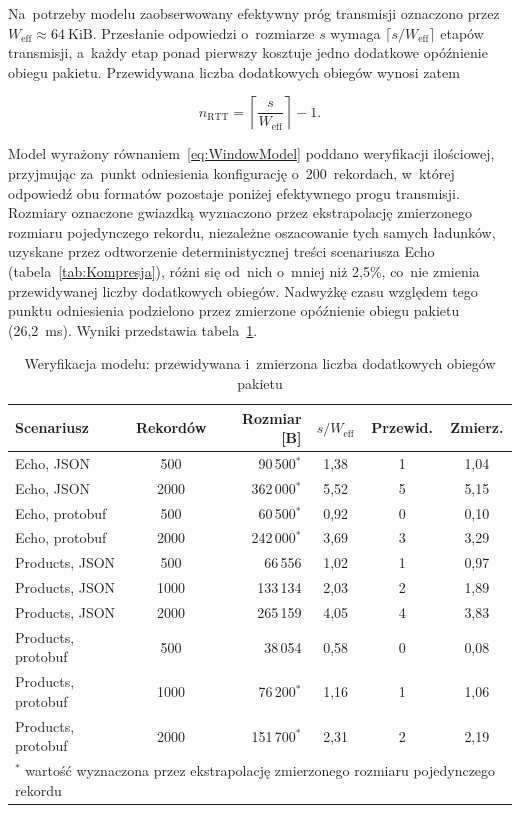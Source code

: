 Na~potrzeby modelu zaobserwowany efektywny próg transmisji oznaczono przez $W_{\mathrm{eff}} \approx 64~\mathrm{KiB}$. Przesłanie odpowiedzi o~rozmiarze $s$ wymaga $\lceil s / W_{\mathrm{eff}} \rceil$ etapów transmisji, a~każdy etap ponad pierwszy kosztuje jedno dodatkowe opóźnienie obiegu pakietu. Przewidywana liczba dodatkowych obiegów wynosi zatem

\begin{equation}
n_{\mathrm{RTT}} = \left\lceil \frac{s}{W_{\mathrm{eff}}} \right\rceil - 1.
\label{eq:WindowModel}
\end{equation}

Model wyrażony równaniem~\ref{eq:WindowModel} poddano weryfikacji ilościowej, przyjmując za~punkt odniesienia konfigurację o~200~rekordach, w~której odpowiedź obu formatów pozostaje poniżej efektywnego progu transmisji. Rozmiary oznaczone gwiazdką wyznaczono przez ekstrapolację zmierzonego rozmiaru pojedynczego rekordu, niezależne oszacowanie tych samych ładunków, uzyskane przez odtworzenie deterministycznej treści scenariusza Echo (tabela~\ref{tab:Kompresja}), różni się od~nich o~mniej niż 2,5\%, co~nie zmienia przewidywanej liczby dodatkowych obiegów. Nadwyżkę czasu względem tego punktu odniesienia podzielono przez zmierzone opóźnienie obiegu pakietu (26,2~ms). Wyniki przedstawia tabela~\ref{tab:WeryfikacjaModelu}.

\begin{table}[htb]
\centering
\footnotesize
\caption{Weryfikacja modelu: przewidywana i~zmierzona liczba dodatkowych obiegów pakietu}
\label{tab:WeryfikacjaModelu}
\begin{tabular}{|l|c|r|c|c|c|}
\hline
\textbf{Scenariusz} & \textbf{Rekordów} & \textbf{Rozmiar [B]} & \textbf{$s/W_{\mathrm{eff}}$} & \textbf{Przewid.} & \textbf{Zmierz.} \\
\hline
Echo, JSON      & 500  & 90\,500$^{*}$   & 1,38 & 1 & 1,04 \\
Echo, JSON      & 2000 & 362\,000$^{*}$  & 5,52 & 5 & 5,15 \\
Echo, protobuf  & 500  & 60\,500$^{*}$   & 0,92 & 0 & 0,10 \\
Echo, protobuf  & 2000 & 242\,000$^{*}$  & 3,69 & 3 & 3,29 \\
\hline
Products, JSON      & 500  & 66\,556   & 1,02 & 1 & 0,97 \\
Products, JSON      & 1000 & 133\,134  & 2,03 & 2 & 1,89 \\
Products, JSON      & 2000 & 265\,159  & 4,05 & 4 & 3,83 \\
Products, protobuf  & 500  & 38\,054   & 0,58 & 0 & 0,08 \\
Products, protobuf  & 1000 & 76\,200$^{*}$   & 1,16 & 1 & 1,06 \\
Products, protobuf  & 2000 & 151\,700$^{*}$  & 2,31 & 2 & 2,19 \\
\hline
\multicolumn{6}{|l|}{\footnotesize $^{*}$ wartość wyznaczona przez ekstrapolację zmierzonego rozmiaru pojedynczego rekordu} \\
\hline
\end{tabular}
\end{table}

